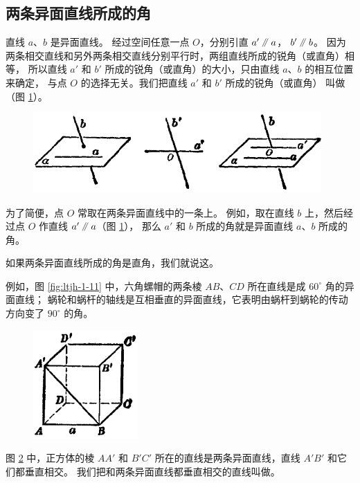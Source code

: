 \subsection{两条异面直线所成的角}\label{subsec:1-6}

直线 $a$、$b$ 是异面直线。 经过空间任意一点 $O$，分别引直 $a' \pingxing a$， $b' \pingxing b$。
因为两条相交直线和另外两条相交直线分别平行时，两组直线所成的锐角（或直角）相等，
所以直线 $a'$ 和 $b'$ 所成的锐角（或直角）的大小，只由直线 $a$、$b$ 的相互位置来确定，
与点 $O$ 的选择无关。我们把直线 $a'$ 和 $b'$ 所成的锐角（或直角）
叫做（图 \ref{fig:ltjh-1-17}）。

\begin{figure}[htbp]
    \centering
    \includegraphics[width=11cm]{../pic/ltjh-ch1-17.png}
    \caption{}\label{fig:ltjh-1-17}
\end{figure}

为了简便，点 $O$ 常取在两条异面直线中的一条上。
例如，取在直线 $b$ 上，然后经过点 $O$ 作直线 $a' \pingxing a$（图 \ref{fig:ltjh-1-17}），
那么 $a'$ 和 $b$ 所成的角就是异面直线 $a$、$b$ 所成的角。

如果两条异面直线所成的角是直角，我们就说这。

例如，图 \ref{fig:ltjh-1-11} 中，六角螺帽的两条棱 $AB$、$CD$ 所在直线是成 $60^\circ$ 角的异面直线；
蜗轮和蜗杆的轴线是互相垂直的异面直线，它表明由蜗杆到蜗轮的传动方向变了 $90^\circ$ 的角。

\begin{figure}
    \centering
    \includegraphics[width=4cm]{../pic/ltjh-ch1-18.png}
    \caption{}\label{fig:ltjh-1-18}
\end{figure}

图 \ref{fig:ltjh-1-18} 中，正方体的棱 $AA'$ 和 $B'C'$ 所在的直线是两条异面直线，直线 $A'B'$ 和它们都垂直相交。
我们把和两条异面直线都垂直相交的直线叫做。

